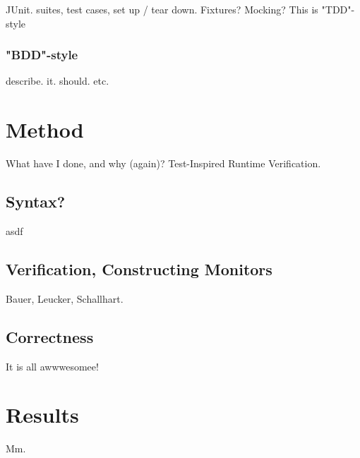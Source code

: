 \documentclass[a4paper,11pt]{kth-mag}
\begin{document}
JUnit. suites, test cases, set up / tear down. Fixtures? Mocking? This is "TDD"-style

\subsection{"BDD"-style}

describe. it. should. etc.







\pagestyle{newchap}
\chapter{Method} \label{chapter-method}

What have I done, and why (again)? Test-Inspired Runtime Verification.


\section{Syntax?}

asdf

\section{Verification, Constructing Monitors}

Bauer, Leucker, Schallhart.

\section{Correctness}

It is all awwwesomee!





\pagestyle{newchap}
\chapter{Results} \label{chapter-results}

Mm.




\end{document}
